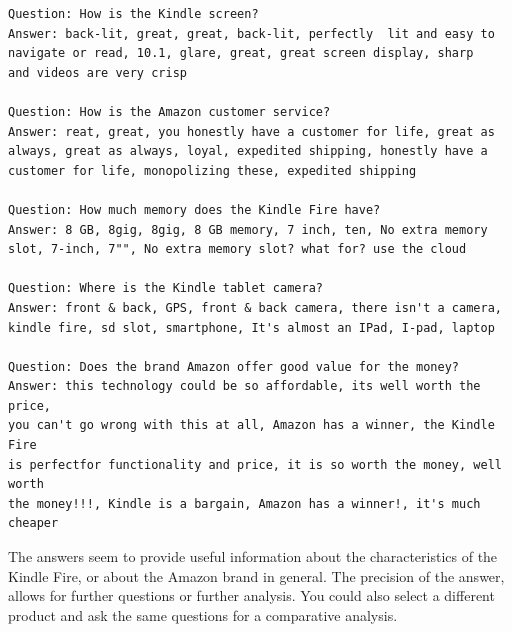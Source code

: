 \begin{Shaded}
\begin{Highlighting}[]
 
  \NormalTok{(}\NormalTok{, }\NormalTok{(}\NormalTok{(answers[[i]][}\NormalTok{]), } \NormalTok{), }\NormalTok{)}
\NormalTok{\}}
\end{Highlighting}
\end{Shaded}

\begin{verbatim}
Question: How is the Kindle screen? 
Answer: back-lit, great, great, back-lit, perfectly  lit and easy to 
navigate or read, 10.1, glare, great, great screen display, sharp
and videos are very crisp 

Question: How is the Amazon customer service? 
Answer: reat, great, you honestly have a customer for life, great as
always, great as always, loyal, expedited shipping, honestly have a 
customer for life, monopolizing these, expedited shipping 

Question: How much memory does the Kindle Fire have? 
Answer: 8 GB, 8gig, 8gig, 8 GB memory, 7 inch, ten, No extra memory
slot, 7-inch, 7"", No extra memory slot? what for? use the cloud 

Question: Where is the Kindle tablet camera? 
Answer: front & back, GPS, front & back camera, there isn't a camera, 
kindle fire, sd slot, smartphone, It's almost an IPad, I-pad, laptop 

Question: Does the brand Amazon offer good value for the money? 
Answer: this technology could be so affordable, its well worth the price,
you can't go wrong with this at all, Amazon has a winner, the Kindle Fire
is perfectfor functionality and price, it is so worth the money, well worth
the money!!!, Kindle is a bargain, Amazon has a winner!, it's much cheaper 
\end{verbatim}

The answers seem to provide useful information about the
characteristics of the Kindle Fire, or about the Amazon brand in general. The precision of the
answer, allows for further questions or further analysis. You could also select
a different product and ask the same questions for a comparative
analysis.

